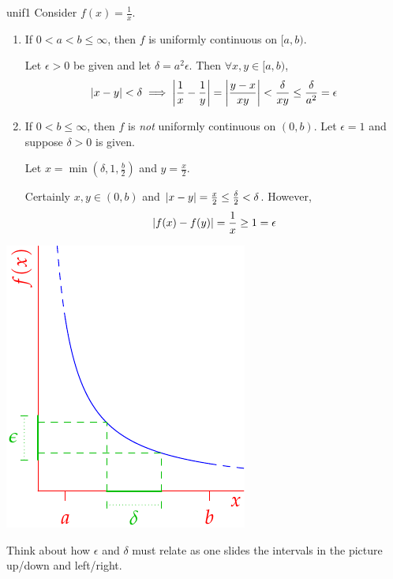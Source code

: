 \begin{example}{}{unif1}
	Consider $f(x)=\frac 1x$.\par
	\begin{minipage}[t]{0.65\linewidth}\vspace{0pt}
		\begin{enumerate}
		\item If $0<a<b\le \infty$, then $f$ is uniformly continuous on $[a,b)$.\par
		Let $\epsilon>0$ be given and let $\delta=a^2\epsilon$. Then $\forall x,y\in[a,b)$,
		\[
			\left| x-y\right|<\delta 
			\implies \left| \frac 1x-\frac 1y\right| =\left| \frac{y-x}{xy}\right|
			<\frac\delta{xy}\le\frac{\delta}{a^2}
			=\epsilon
		\]
		\item If $0<b\le\infty$, then $f$ is \emph{not} uniformly continuous on $(0,b)$.\smallbreak
		Let $\epsilon=1$ and suppose $\delta>0$ is given.\par
		Let $x=\min(\delta,1,\tfrac b2)$ and $y=\frac x2$.\par
		Certainly $x,y\in(0,b)$ and $\left| x-y\right|=\frac x2\le\frac\delta 2<\delta$. However,
		\[
			\left| f(x)-f(y)\right|=\frac 1x\ge 1=\epsilon
		\]
		\end{enumerate}
	\end{minipage}
	\hfill
	\begin{minipage}[t]{0.34\linewidth}\vspace{0pt}
		\flushright\includegraphics{unif1}
	\end{minipage}
	\bigbreak
	Think about how $\epsilon$ and $\delta$ must relate as one slides the intervals in the picture up/down and left/right.
\end{example}

